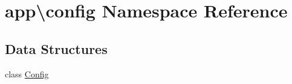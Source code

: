 \hypertarget{namespaceapp_1_1config}{\section{app\textbackslash{}config Namespace Reference}
\label{namespaceapp_1_1config}
}
\subsection*{Data Structures}
\begin{DoxyCompactItemize}
\item 
class \hyperlink{classapp_1_1config_1_1_config}{Config}
\end{DoxyCompactItemize}
